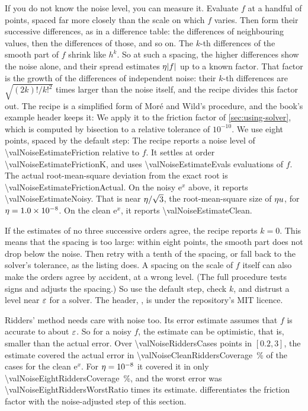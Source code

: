 If you do not know the noise level, you can measure it. Evaluate $f$ at a handful of points, spaced far more closely
than the scale on which $f$ varies. Then form their successive differences, as in a difference table: the
differences of neighbouring values, then the differences of those, and so on. The $k$-th differences of the smooth
part of $f$ shrink like $h^k$. So at such a spacing, the higher differences show the noise alone, and their spread
estimates $\eta \lvert f \rvert$ up to a known factor. That factor is the growth of the differences of independent noise:
their $k$-th differences are $\sqrt{(2k)! / k!^2}$ times larger than the noise itself, and the recipe divides this
factor out. The recipe is a simplified form of Mor\'e and Wild's procedure,\cite{more2011} and the book's example
header keeps it:
We apply it to the friction factor of \cref{sec:using-solver}, which is computed by bisection to a relative tolerance
of $10^{-10}$. We use eight points, spaced by the default step:
The recipe reports a noise level of \num{\valNoiseEstimateFriction} relative to $f$. It settles at order
\num{\valNoiseEstimateFrictionK}, and uses \num{\valNoiseEstimateEvals} evaluations of $f$. The actual root-mean-square
deviation from the exact root is \num{\valNoiseEstimateFrictionActual}. On the noisy $\mathrm{e}^x$ above, it reports
\num{\valNoiseEstimateNoisy}. That is near $\eta / \sqrt{3}$, the root-mean-square size of $\eta u$, for
$\eta = \num{1.0e-8}$. On the clean $\mathrm{e}^x$, it reports \num{\valNoiseEstimateClean}.

If the estimates of no three successive orders agree, the recipe reports $k = 0$. This means that the spacing is too
large: within eight points, the smooth part does not drop below the noise. Then retry with a tenth of the spacing, or
fall back to the solver's tolerance, as the listing does. A spacing on the scale of $f$ itself can also make the
orders agree by accident, at a wrong level. (The full procedure tests signs and adjusts the spacing.) So use the
default step, check $k$, and distrust a level near $\varepsilon$ for a solver. The header,
, is under the repository's MIT licence.

Ridders' method needs care with noise too. Its error estimate assumes that $f$ is accurate to about $\varepsilon$. So
for a noisy $f$, the estimate can be optimistic, that is, smaller than the actual error. Over
\num{\valNoiseRiddersCases} points in $[0.2, 3]$, the estimate covered the actual error in
\SI{\valNoiseCleanRiddersCoverage}{\percent} of the cases for the clean $\mathrm{e}^x$. For $\eta = 10^{-8}$ it
covered it in only \SI{\valNoiseEightRiddersCoverage}{\percent}, and the worst error was
\num{\valNoiseEightRiddersWorstRatio} times its estimate.  differentiates the friction factor
with the noise-adjusted step of this section.


